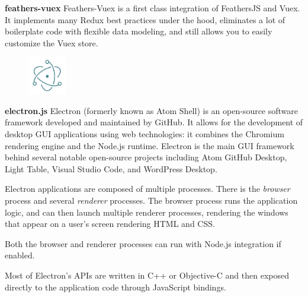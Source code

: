 	\vs
	\textbf{\Large feathers-vuex}
	\vs
	Feathers-Vuex is a first class integration of FeathersJS and Vuex. It implements many Redux best practices under the hood, eliminates a lot of boilerplate code with flexible data modeling, and still allows you to easily customize the Vuex store.
	\vs[1.5]
	\begin{figure}
		\centering
		\vspace{-20pt}
		\includegraphics[width=0.15\textwidth]{electron.png}
		\vspace{-10pt}
	\end{figure}
	\vs
	\textbf{\Large electron.js}
	\vs
	Electron (formerly known as Atom Shell) is an open-source software framework developed and maintained by GitHub. It allows for the development of desktop GUI applications using web technologies: it combines the Chromium rendering engine and the Node.js runtime. Electron is the main GUI framework behind several notable open-source projects including Atom  GitHub Desktop, Light Table, Visual Studio Code, and WordPress Desktop.
	
	Electron applications are composed of multiple processes. There is the \emph{browser} process and several \emph{renderer} processes. The browser process runs the application logic, and can then launch multiple renderer processes, rendering the windows that appear on a user's screen rendering HTML and CSS.
	
	Both the browser and renderer processes can run with Node.js integration if enabled.
	
	Most of Electron's APIs are written in C++ or Objective-C and then exposed directly to the application code through JavaScript bindings.
	\vs[1.5]
	
